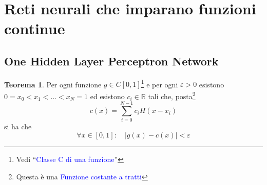 \documentclass[10pt]{book}
\newcommand{\1}{\mathds{1}}
\newcommand{\R}{\mathds{R}}
\theoremstyle{definition}%
\newtheorem{thm}{Teorema}[section]
\theoremstyle{plain}
\theoremstyle{remark}
\renewcommand{\href}[2]{\textcolor{blue}{#2}}
\begin{document}
\section{Reti neurali che imparano funzioni continue}
\label{sec:org5971c2e}

\subsection{One Hidden Layer Perceptron Network}
\label{sec:org8efe088}
\begin{thm}
Per ogni funzione \(g \in C[0,1]\)\footnote{Vedi ``\href{../../../../../org/roam/20250113125602-classe_c_di_una_funzione.org}{Classe C di una funzione}''} e per ogni \(\varepsilon>0\) esistono \(0=x_{0}<x_{1}<\dots<x_{N} = 1\) ed esistono \(c_{i} \in \R\) tali che, posta\footnote{Questa è una \href{../../../../../org/roam/20250701140621-funzione_costante_a_tratti.org}{Funzione costante a tratti}}
\begin{equation*}
c(x) = \sum_{i=0}^{N-1} c_{i} H(x-x_{i})
\end{equation*}
si ha che
\begin{equation*}
\forall x \in [0,1]:\quad |g(x)-c(x)|<\varepsilon
\end{equation*}
\end{thm}
\end{document}
